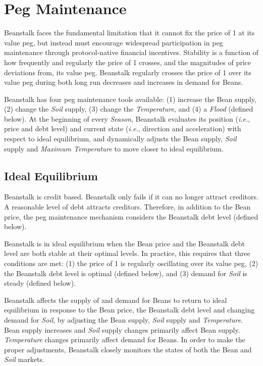 \documentclass[tikz]{article}
\newcommand{\term}[1]{\textsl{#1}}
\newcommand{\Bean}{} %
\begin{document}
\newpage

\section{Peg Maintenance}

\vspace*{2mm}


Beanstalk faces the fundamental limitation that it cannot fix the price of \Bean1 at its value peg, but instead must encourage widespread participation in peg maintenance through protocol-native financial incentives. Stability is a function of how frequently and regularly the price of \Bean1 crosses, and the magnitudes of price deviations from, its value peg. Beanstalk regularly crosses the price of \Bean1 over its value peg during both long run decreases and increases in demand for Beans.

Beanstalk has four peg maintenance tools available: (1) increase the Bean supply, (2) change the \term{Soil} supply, (3) change the \term{Temperature}, and (4) a \term{Flood} (defined below). At the beginning of every \term{Season}, Beanstalk evaluates its position (\term{i.e.}, price and debt level) and current state (\term{i.e.}, direction and acceleration) with respect to ideal equilibrium, and dynamically adjusts the Bean supply, \term{Soil} supply and \term{Maximum Temperature} to move closer to ideal equilibrium.

\vspace*{2mm}
\subsection{Ideal Equilibrium}
\vspace*{2mm}

Beanstalk is credit based. Beanstalk only fails if it can no longer attract creditors. A reasonable level of debt attracts creditors. Therefore, in addition to the Bean price, the peg maintenance mechanism considers the Beanstalk debt level (defined below). 

Beanstalk is in ideal equilibrium when the Bean price and the Beanstalk debt level are both stable at their optimal levels. In practice, this requires that three conditions are met: (1) the price of \Bean1 is regularly oscillating over its value peg, (2) the Beanstalk debt level is optimal (defined below), and (3) demand for \term{Soil} is steady (defined below). 

Beanstalk affects the supply of and demand for Beans to return to ideal equilibrium in response to the Bean price, the Beanstalk debt level and changing demand for \term{Soil}, by adjusting the Bean supply, \term{Soil} supply and \term{Temperature}. Bean supply increases and \term{Soil} supply changes primarily affect Bean supply. \term{Temperature} changes primarily affect demand for Beans. In order to make the proper adjustments, Beanstalk closely monitors the states of both the Bean and \term{Soil} markets.
\end{document}
